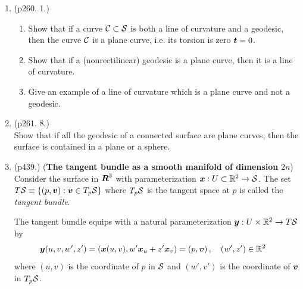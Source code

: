 \documentclass[11pt]{article}
\begin{document}
\begin{enumerate}
\item  \begin{example} \citep{do1976differential} (p260. 1.)
\begin{enumerate}
\item Show that if a curve ${\mathcal C} \subset {\mathcal S}$ is both a line of curvature and a geodesic, then the curve ${\mathcal C}$ is a plane curve, i.e. its torsion is zero $\boldsymbol{t} = 0$.

\item Show that if a (nonrectilinear) geodesic is a plane curve, then it is a line of curvature.

\item Give an example of a line of curvature which is a plane curve and not a geodesic. 
\end{enumerate}
\end{example}

\item \begin{example} \citep{do1976differential} (p261. 8.)\\
Show that if all the geodesic of a connected surface are plane curves, then the surface is contained in a plane or a sphere. 
\end{example}


\item \begin{example}\citep{do1976differential} (p439.)
(\textbf{The tangent bundle as a smooth manifold of dimension} $2n$) \\
Consider the surface in $\boldsymbol{R}^{3}$ with parameterization $\boldsymbol{x}: U \subset {\mathbb R}^{2}\rightarrow {\mathcal S}$. The set $T{\mathcal S} \equiv \left\{(p, \boldsymbol{v}): \boldsymbol{v}\in T_{p}{\mathcal S}\right\}$ where $T_{p}{\mathcal S}$ is the tangent space at $p$ is called the \emph{tangent bundle}.  

The tangent bundle equips with a natural parameterization  $\boldsymbol{y}: U \times {\mathbb R}^{2} \rightarrow T{\mathcal S}$ by 
\begin{align*}
\boldsymbol{y}(u, v, w', z') &= \left(\boldsymbol{x}(u,v),  w'\boldsymbol{x}_{u} + z'\boldsymbol{x}_{v}\right)  = \left(p, \boldsymbol{v}\right),\quad (w',z')\in {\mathbb R}^{2}
\end{align*} 
where $(u,v)$ is the coordinate of $p$ in ${\mathcal S}$ and $(w',v')$ is the coordinate of $\boldsymbol{v}$ in $T_{p}{\mathcal S}$.  


\end{example}
\end{enumerate}
\end{document}
